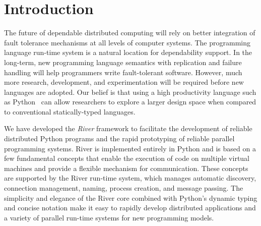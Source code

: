 \section{Introduction}
\label{sec:Introduction}

The future of dependable distributed computing will rely on better
integration of fault tolerance mechanisms at all levels of computer
systems. The programming language run-time system is a natural
location for dependability support. In the long-term, new programming
language semantics with replication and failure handling will help
programmers write fault-tolerant software. However, much more research,
development, and experimentation will be required before new languages
are adopted.  Our belief is that using a high productivity language such as Python~\cite{Python} can allow researchers to explore a larger design space when compared to conventional statically-typed languages.

We have developed the \emph{River} framework to facilitate the
development of reliable distributed Python programs and the rapid
prototyping of reliable parallel programming systems. River is
implemented entirely in Python and is based on a few fundamental
concepts that enable the execution of code on multiple virtual machines
and provide a flexible mechanism for communication. These concepts are
supported by the River run-time system, which manages automatic
discovery, connection management, naming, process creation, and message
passing. The simplicity and elegance of the River core combined with
Python's dynamic typing and concise notation make it easy to rapidly
develop distributed applications and a variety of parallel run-time
systems for new programming models. 



